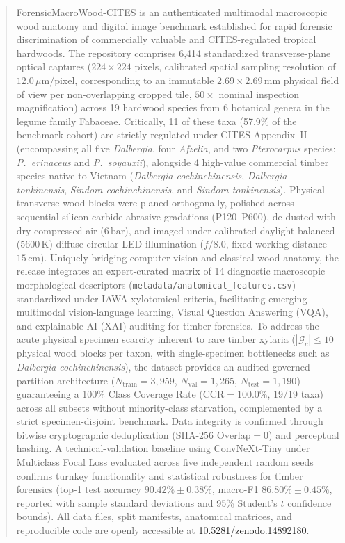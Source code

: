 \documentclass[a4paper,fleqn,12pt]{cas-sc}
\begin{document}
\begin{abstract}
ForensicMacroWood-CITES is an authenticated multimodal macroscopic wood anatomy and digital image benchmark established for rapid forensic discrimination of commercially valuable and CITES-regulated tropical hardwoods. The repository comprises 6,414 standardized transverse-plane optical captures ($224 \times 224$ pixels, calibrated spatial sampling resolution of $12.0\,\mu\text{m/pixel}$, corresponding to an immutable $2.69 \times 2.69\,\text{mm}$ physical field of view per non-overlapping cropped tile, $50\times$ nominal inspection magnification) across 19 hardwood species from 6 botanical genera in the legume family Fabaceae. Critically, 11 of these taxa (57.9\% of the benchmark cohort) are strictly regulated under CITES Appendix~II (encompassing all five \textit{Dalbergia}, four \textit{Afzelia}, and two \textit{Pterocarpus} species: \textit{P.~erinaceus} and \textit{P.~soyauxii}), alongside 4 high-value commercial timber species native to Vietnam (\textit{Dalbergia cochinchinensis}, \textit{Dalbergia tonkinensis}, \textit{Sindora cochinchinensis}, and \textit{Sindora tonkinensis}). Physical transverse wood blocks were planed orthogonally, polished across sequential silicon-carbide abrasive gradations (P120--P600), de-dusted with dry compressed air ($6\,\text{bar}$), and imaged under calibrated daylight-balanced ($5600\,\text{K}$) diffuse circular LED illumination ($f/8.0$, fixed working distance $15\,\text{cm}$). Uniquely bridging computer vision and classical wood anatomy, the release integrates an expert-curated matrix of 14 diagnostic macroscopic morphological descriptors (\texttt{metadata/anatomical\_features.csv}) standardized under IAWA xylotomical criteria, facilitating emerging multimodal vision-language learning, Visual Question Answering (VQA), and explainable AI (XAI) auditing for timber forensics. To address the acute physical specimen scarcity inherent to rare timber xylaria ($|\mathcal{G}_c| \le 10$ physical wood blocks per taxon, with single-specimen bottlenecks such as \textit{Dalbergia cochinchinensis}), the dataset provides an audited governed partition architecture ($N_{\text{train}} = 3,959$, $N_{\text{val}} = 1,265$, $N_{\text{test}} = 1,190$) guaranteeing a 100\% Class Coverage Rate ($\text{CCR} = 100.0\%$, 19/19 taxa) across all subsets without minority-class starvation, complemented by a strict specimen-disjoint benchmark. Data integrity is confirmed through bitwise cryptographic deduplication ($\text{SHA-256 Overlap} = 0$) and perceptual hashing. A technical-validation baseline using ConvNeXt-Tiny under Multiclass Focal Loss evaluated across five independent random seeds confirms turnkey functionality and statistical robustness for timber forensics (top-1 test accuracy $90.42\% \pm 0.38\%$, macro-F1 $86.80\% \pm 0.45\%$, reported with sample standard deviations and 95\% Student's $t$ confidence bounds). All data files, split manifests, anatomical matrices, and reproducible code are openly accessible at \href{https://doi.org/10.5281/zenodo.14892180}{10.5281/zenodo.14892180}.
\end{abstract}
\end{document}
